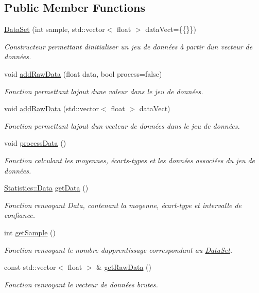 \subsection*{Public Member Functions}
\begin{DoxyCompactItemize}
\item 
\hyperlink{classDataSet_ab45c95dc19f12a9217c0f3da7ac92b6a}{Data\+Set} (int sample, std\+::vector$<$ float $>$ data\+Vect=\{\{\}\})
\begin{DoxyCompactList}\small\item\em Constructeur permettant d\textquotesingle{}initialiser un jeu de données à partir d\textquotesingle{}un vecteur de données. \end{DoxyCompactList}\item 
void \hyperlink{classDataSet_ac2453c8cd424ed33b941363a45c009f8}{add\+Raw\+Data} (float data, bool process=false)
\begin{DoxyCompactList}\small\item\em Fonction permettant l\textquotesingle{}ajout d\textquotesingle{}une valeur dans le jeu de données. \end{DoxyCompactList}\item 
void \hyperlink{classDataSet_a71cfe353100966c9bdfb1f6880075691}{add\+Raw\+Data} (std\+::vector$<$ float $>$ data\+Vect)
\begin{DoxyCompactList}\small\item\em Fonction permettant l\textquotesingle{}ajout d\textquotesingle{}un vecteur de données dans le jeu de données. \end{DoxyCompactList}\item 
void \hyperlink{classDataSet_a6e174dbffadb1a262c6cc92781d0bd12}{process\+Data} ()
\begin{DoxyCompactList}\small\item\em Fonction calculant les moyennes, écarts-\/types et les données associées du jeu de données. \end{DoxyCompactList}\item 
\hyperlink{structStatistics_1_1Data}{Statistics\+::\+Data} \hyperlink{classDataSet_af646e5b745734c1b18f2e90117e1d3c1}{get\+Data} ()
\begin{DoxyCompactList}\small\item\em Fonction renvoyant Data, contenant la moyenne, écart-\/type et intervalle de confiance. \end{DoxyCompactList}\item 
int \hyperlink{classDataSet_a29e3936319d5b2fda4f74b033c556766}{get\+Sample} ()
\begin{DoxyCompactList}\small\item\em Fonction renvoyant le nombre d\textquotesingle{}apprentissage correspondant au \hyperlink{classDataSet}{Data\+Set}. \end{DoxyCompactList}\item 
const std\+::vector$<$ float $>$ \& \hyperlink{classDataSet_a05c7eba44d4d75941172628b1845f108}{get\+Raw\+Data} ()
\begin{DoxyCompactList}\small\item\em Fonction renvoyant le vecteur de données brutes. \end{DoxyCompactList}\end{DoxyCompactItemize}

